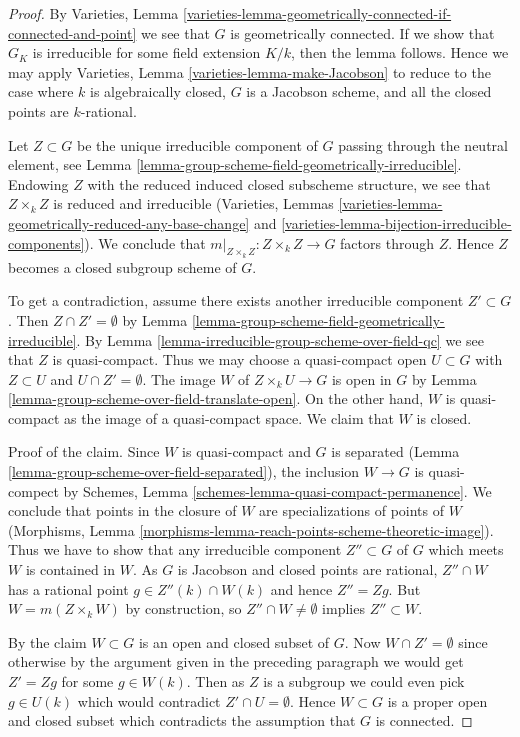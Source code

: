 \begin{proof}
By Varieties, Lemma
\ref{varieties-lemma-geometrically-connected-if-connected-and-point}
we see that $G$ is geometrically connected. If we show that $G_K$
is irreducible for some field extension $K/k$, then
the lemma follows. Hence we may apply
Varieties, Lemma \ref{varieties-lemma-make-Jacobson}
to reduce to the case where $k$ is algebraically closed,
$G$ is a Jacobson scheme, and all the closed points are $k$-rational.

\medskip\noindent
Let $Z \subset G$ be the unique irreducible component of $G$ passing
through the neutral element, see
Lemma \ref{lemma-group-scheme-field-geometrically-irreducible}.
Endowing $Z$ with the reduced induced closed subscheme structure,
we see that $Z \times_k Z$ is reduced and irreducible
(Varieties, Lemmas
\ref{varieties-lemma-geometrically-reduced-any-base-change} and
\ref{varieties-lemma-bijection-irreducible-components}).
We conclude that $m|_{Z \times_k Z} : Z \times_k Z \to G$ factors
through $Z$. Hence $Z$ becomes a closed subgroup scheme of $G$.

\medskip\noindent
To get a contradiction, assume there exists another irreducible
component $Z' \subset G$. Then $Z \cap Z' = \emptyset$ by
Lemma \ref{lemma-group-scheme-field-geometrically-irreducible}.
By Lemma \ref{lemma-irreducible-group-scheme-over-field-qc}
we see that $Z$ is quasi-compact. Thus we may choose a quasi-compact open
$U \subset G$ with $Z \subset U$ and $U \cap Z' = \emptyset$.
The image $W$ of $Z \times_k U \to G$ is open in $G$ by
Lemma \ref{lemma-group-scheme-over-field-translate-open}.
On the other hand, $W$ is quasi-compact as the image of a
quasi-compact space. We claim that $W$ is closed.

\medskip\noindent
Proof of the claim. Since $W$ is quasi-compact and $G$ is separated
(Lemma \ref{lemma-group-scheme-over-field-separated}), the inclusion
$W \to G$ is quasi-compect by Schemes, Lemma
\ref{schemes-lemma-quasi-compact-permanence}. We conclude that
points in the closure of $W$ are specializations of points of $W$
(Morphisms, Lemma \ref{morphisms-lemma-reach-points-scheme-theoretic-image}).
Thus we have to show that any irreducible
component $Z'' \subset G$ of $G$ which meets $W$ is contained in $W$.
As $G$ is Jacobson and closed points are rational,
$Z'' \cap W$ has a rational point
$g \in Z''(k) \cap W(k)$ and hence $Z'' = Zg$. But $W = m(Z \times_k W)$
by construction, so $Z'' \cap W \not = \emptyset$ implies
$Z'' \subset W$.

\medskip\noindent
By the claim $W \subset G$ is an open and closed subset of $G$.
Now $W \cap Z' = \emptyset$ since otherwise by the argument given in
the preceding paragraph we would get $Z' = Zg$ for some $g \in W(k)$.
Then as $Z$ is a subgroup we could even pick $g \in U(k)$ which would
contradict $Z' \cap U = \emptyset$. Hence $W \subset G$ is a proper open
and closed subset which contradicts the assumption that $G$ is connected.
\end{proof}

